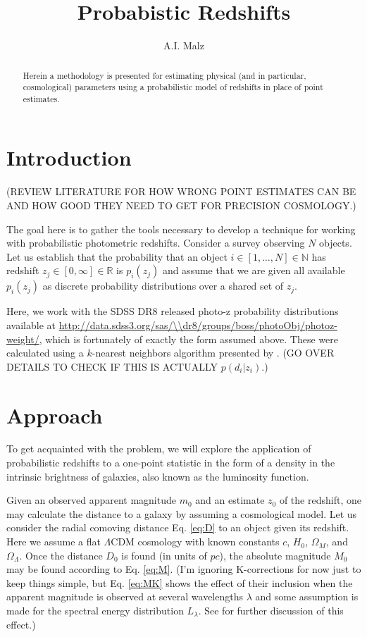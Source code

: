 \documentclass[12pt, onecolumn]{emulateapj}
\begin{document}
\title{Probabistic Redshifts}

\author{A.I. Malz}

\begin{abstract}
Herein a methodology is presented for estimating physical (and in particular, cosmological) parameters using a probabilistic model of redshifts in place of point estimates.  
\end{abstract}


\section{Introduction}

(REVIEW LITERATURE FOR HOW WRONG POINT ESTIMATES CAN BE AND HOW GOOD THEY NEED TO GET FOR PRECISION COSMOLOGY.)

The goal here is to gather the tools necessary to develop a technique for working with probabilistic photometric redshifts.  Consider a survey observing $N$ objects.  Let us establish that the probability that an object $i\in[1,\dots,N]\in\mathbb{N}$ has redshift $z_{j}\in[0,\infty]\in\mathbb{R}$ is $p_{i}(z_{j})$ and assume that we are given all available $p_{i}(z_{j})$ as discrete probability distributions over a shared set of $z_{j}$.   

Here, we work with the SDSS DR8 released photo-z probability distributions available at \url{http://data.sdss3.org/sas/\\dr8/groups/boss/photoObj/photoz-weight/}, which is fortunately of exactly the form assumed above.  These were calculated using a $k$-nearest neighbors algorithm presented by \citet{she11}.  (GO OVER DETAILS TO CHECK IF THIS IS ACTUALLY $p(d_{i}|z_{i})$.)

\section{Approach}

To get acquainted with the problem, we will explore the application of probabilistic redshifts to a one-point statistic in the form of a density in the intrinsic brightness of galaxies, also known as the luminosity function.  

Given an observed apparent magnitude $m_{0}$ and an estimate $z_{0}$ of the redshift, one may calculate the distance to a galaxy by assuming a cosmological model.  Let us consider the radial comoving distance Eq. \ref{eq:D} to an object given its redshift.  Here we assume a flat $\Lambda$CDM cosmology with known constants $c$, $H_{0}$, $\Omega_{M}$, and $\Omega_{\Lambda}$.  Once the distance $D_{0}$ is found (in units of $pc$), the absolute magnitude $M_{0}$ may be found according to Eq. \ref{eq:M}.  (I'm ignoring K-corrections for now just to keep things simple, but Eq. \ref{eq:MK} shows the effect of their inclusion when the apparent magnitude is observed at several wavelengths $\lambda$ and some assumption is made for the spectral energy distribution $L_{\lambda}$.  See \citet{hog99} for further discussion of this effect.)
\end{document}
